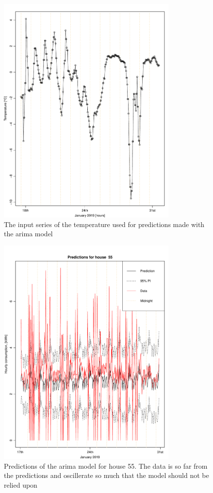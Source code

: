 \begin{figure}
    \centering
    \includegraphics[width=0.8\textwidth]{../../../figures/TestWeatherHour.pdf}
    \caption{The input series of the temperature used for predictions made with the arima model}
    \label{fig:weather_pred_hour}
\end{figure}


\begin{figure}
    \centering
    \includegraphics[width=0.8\textwidth]{../../../figures/arimax/arima1_pred_55.pdf}
    \caption{Predictions of the arima model for house 55. The data is so far from the predictions and oscillerate so much that the model should not be relied upon}
    \label{fig:arima1_pred_55}
\end{figure}

